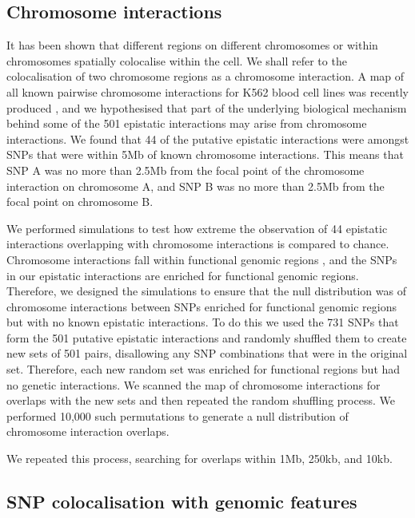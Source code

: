 \documentclass{article}
\begin{document}
\subsection{Chromosome interactions}

It has been shown \cite{Lieberman-Aiden2009} that different regions on different chromosomes or within chromosomes spatially colocalise within the cell. We shall refer to the colocalisation of two chromosome regions as a chromosome interaction. A map of all known pairwise chromosome interactions for K562 blood cell lines was recently produced \cite{Lan2012}, and we hypothesised that part of the underlying biological mechanism behind some of the 501 epistatic interactions may arise from chromosome interactions. We found that 44 of the putative epistatic interactions were amongst SNPs that were within 5Mb of known chromosome interactions. This means that SNP A was no more than 2.5Mb from the focal point of the chromosome interaction on chromosome A, and SNP B was no more than 2.5Mb from the focal point on chromosome B.

We performed simulations to test how extreme the observation of 44 epistatic interactions overlapping with chromosome interactions is compared to chance. Chromosome interactions fall within functional genomic regions \cite{Lieberman-Aiden2009, Lan2012}, and the SNPs in our epistatic interactions are enriched for functional genomic regions. Therefore, we designed the simulations to ensure that the null distribution was of chromosome interactions between SNPs enriched for functional genomic regions but with no known epistatic interactions. To do this we used the 731 SNPs that form the 501 putative epistatic interactions and randomly shuffled them to create new sets of 501 pairs, disallowing any SNP combinations that were in the original set. Therefore, each new random set was enriched for functional regions but had no genetic interactions. We scanned the map of chromosome interactions for overlaps with the new sets and then repeated the random shuffling process. We performed 10,000 such permutations to generate a null distribution of chromosome interaction overlaps.

We repeated this process, searching for overlaps within 1Mb, 250kb, and 10kb.


\subsection{SNP colocalisation with genomic features}
\label{sub:snp_colocalisation_with_genomic_features}
\end{document}
